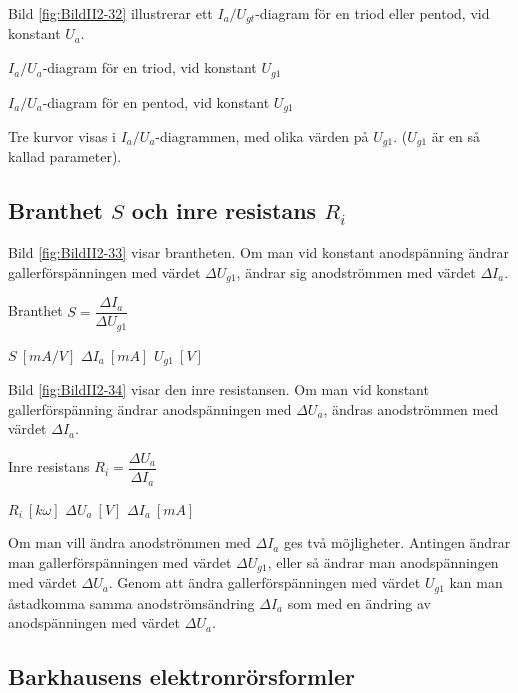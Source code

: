 
Bild \ref{fig:BildII2-32} illustrerar ett \(I_a/U_{gt}\)-diagram för en triod
eller pentod, vid konstant \(U_a\).

\(I_a/U_a\)-diagram för en triod, vid konstant \(U_{g1}\)

\(I_a/U_a\)-diagram för en pentod, vid konstant \(U_{g1}\)

Tre kurvor visas i \(I_a/U_a\)-diagrammen, med olika värden på
\(U_{g1}\). (\(U_{g1}\) är en så kallad parameter).


\subsection{Branthet $S$ och inre resistans $R_i$}

Bild \ref{fig:BildII2-33} visar brantheten.
Om man vid konstant anodspänning ändrar gallerförspänningen med värdet
\(\Delta U_{g1}\), ändrar sig anodströmmen med värdet \(\Delta I_a\).

Branthet \(S = \dfrac{\Delta I_a}{\Delta U_{g1}}\)

\(S\ [mA/V]\) \(\Delta I_a\ [mA]\) \(U_{g1}\ [V]\)

Bild \ref{fig:BildII2-34} visar den inre resistansen.
Om man vid konstant gallerförspänning ändrar anodspänningen med
\(\Delta U_a\), ändras anodströmmen med värdet \(\Delta I_a\).

\newpage

Inre resistans \(R_i = \dfrac{\Delta U_a}{\Delta I_a}\)

\(R_i\ [k \omega]\)  \(\Delta U_a\ [V]\)  \(\Delta I_a\ [mA]\)


Om man vill ändra anodströmmen med \(\Delta I_a\) ges två möjligheter.
Antingen ändrar man gallerförspänningen med värdet \(\Delta U_{g1}\), eller så
ändrar man anodspänningen med värdet \(\Delta U_a\).
Genom att ändra gallerförspänningen med värdet \(U_{g1}\) kan man åstadkomma
samma anodströmsändring \(\Delta I_a\) som med en ändring av anodspänningen
med värdet \(\Delta U_a\).

\subsection{Barkhausens elektronrörsformler}

